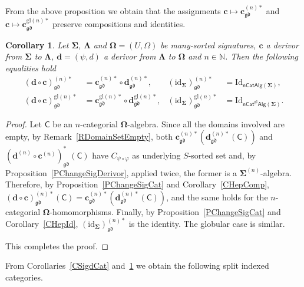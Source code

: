 \documentclass[a4paper, reqno
]{amsart}
\newcommand{\sig}[1]{\mathbf{#1}}             %
\newcommand{\calg}[1]{\boldsymbol{\mathsf{#1}}} %
\newcommand{\id}{\mathrm{id}}
\newcommand{\Id}{\mathrm{Id}}
\newcommand{\gd}{\mathfrak{gd}}              %
\newcommand{\gl}{\mathrm{gl}}                %
\theoremstyle{plain}
\newtheorem{corollary}[theorem]{Corollary}
\theoremstyle{definition}
\begin{document}
From the above proposition we obtain that the assignments $\mathbf{c}\mapsto\mathbf{c}^{(n)\ast}_{\gd}$ and $\mathbf{c}\mapsto\mathbf{c}^{\gl(n)\ast}_{\gd}$ preserve compositions and identities.

\begin{corollary}\label{CChangeSigCat}
Let $\sig{\Sigma}$, $\sig{\Lambda}$ and $\sig{\Omega}=(U,\Omega)$ be many-sorted signatures, $\mathbf{c}$ a derivor from $\sig{\Sigma}$ to $\sig{\Lambda}$, $\mathbf{d}=(\psi,d)$ a derivor from $\sig{\Lambda}$ to $\sig{\Omega}$ and $n\in\mathbb{N}$.
Then the following equalities hold
\begin{align*}
(\mathbf{d}\circ\mathbf{c})^{(n)\ast}_{\gd}&=\mathbf{c}^{(n)\ast}_{\gd}\circ\mathbf{d}^{(n)\ast}_{\gd},
&
(\id_{\sig{\Sigma}})^{(n)\ast}_{\gd}&=\Id_{\mathsf{nCatAlg}(\sig{\Sigma})},
\\
(\mathbf{d}\circ\mathbf{c})^{\gl(n)\ast}_{\gd}&=\mathbf{c}^{\gl(n)\ast}_{\gd}\circ\mathbf{d}^{\gl(n)\ast}_{\gd},
&
(\id_{\sig{\Sigma}})^{\gl(n)\ast}_{\gd}&=\Id_{\mathsf{nCat}^{\gl}\mathsf{Alg}(\sig{\Sigma})}.
\end{align*}
\end{corollary}
\begin{proof}
Let $\calg{C}$ be an $n$-categorial $\sig{\Omega}$-algebra.
Since all the domains involved are empty, by Remark~\ref{RDomainSetEmpty}, both $\mathbf{c}^{(n)\ast}_{\gd}(\mathbf{d}^{(n)\ast}_{\gd}(\calg{C}))$ and $(\mathbf{d}^{(n)}\circ\mathbf{c}^{(n)})^{\ast}_{\gd}(\calg{C})$ have $C_{\psi\circ\varphi}$ as underlying $S$-sorted set and, by Proposition~\ref{PChangeSigDerivor}, applied twice, the former is a $\sig{\Sigma}^{(n)}$-algebra.
Therefore, by Proposition~\ref{PChangeSigCat} and Corollary~\ref{CHepComp}, $(\mathbf{d}\circ\mathbf{c})^{(n)\ast}_{\gd}(\calg{C})=\mathbf{c}^{(n)\ast}_{\gd}(\mathbf{d}^{(n)\ast}_{\gd}(\calg{C}))$, and the same holds for the $n$-categorial $\sig{\Omega}$-homomorphisms.
Finally, by Proposition~\ref{PChangeSigCat} and Corollary~\ref{CHepId}, $(\id_{\sig{\Sigma}})^{(n)\ast}_{\gd}$ is the identity.
The globular case is similar.

This completes the proof.
\end{proof}

From Corollaries~\ref{CSigdCat} and~\ref{CChangeSigCat} we obtain the following split indexed categories.
\end{document}

